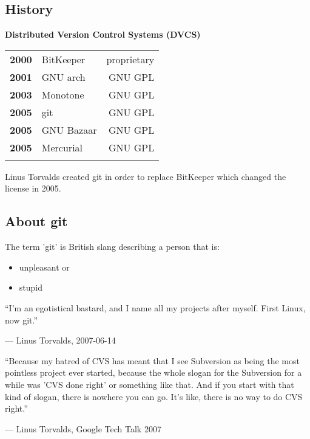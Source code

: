\subsection{History}
\begin{frame}
  \subslidetitle
  \textbf{Distributed Version Control Systems (DVCS)}
  \pause
  \\
  \begin{tabular}{lp{6cm}r}
    \textbf{2000} & BitKeeper  & proprietary \\
    \pause
    \textbf{2001} & GNU arch   & GNU GPL \\
    \pause
    \textbf{2003} & Monotone   & GNU GPL \\
    \pause
    \textbf{2005} & git & GNU GPL \\
    \pause
    \textbf{2005} & GNU Bazaar & GNU GPL \\
    \pause
    \textbf{2005} & Mercurial  & GNU GPL \\
    \pause
  \end{tabular}

  Linus Torvalds created git in order to replace BitKeeper which changed the license in 2005.
\end{frame}

\subsection{About git}
\begin{frame}
  \subslidetitle
   The term 'git' is British slang describing a person that is:
  \begin{itemize}
    \item unpleasant or
    \item stupid
  \end{itemize}

  \pause
  \epigraph{``I'm an egotistical bastard, and I name all my projects after myself. First Linux, now git.''}
       {--- Linus Torvalds, 2007-06-14}
  \pause
  \epigraph{``Because my hatred of CVS has meant that I see Subversion as being the most pointless project ever started, because the whole slogan for the Subversion for a while was 'CVS done right' or something like that. And if you start with that kind of slogan, there is nowhere you can go. It's like, there is no way to do CVS right.''}
      {--- Linus Torvalds, Google Tech Talk 2007}
\end{frame}

